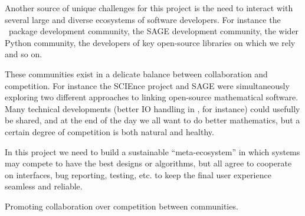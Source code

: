 Another source of unique challenges for this project is the need to
interact with several large and diverse ecosystems of software
developers. For instance the \GAP\ package development community, the
SAGE development community, the wider Python community, the developers
of key open-source libraries on which we rely and so on.

These communities exist in a delicate balance between collaboration
and competition. For instance the SCIEnce project and SAGE were
simultaneously exploring two different approaches to linking
open-source mathematical software. Many technical developments (better
IO handling in \GAP, for instance) could usefully be shared, and at
the end of the day we all want to do better mathematics, but a certain
degree of competition is both natural and healthy.

In this project we need to build a sustainable ``meta-ecosystem'' in
which systems may compete to have the best designs or algorithms, but
all agree to cooperate on interfaces, bug reporting, testing, etc. to
keep the final user experience seamless and reliable.


Promoting collaboration over competition between communities.

